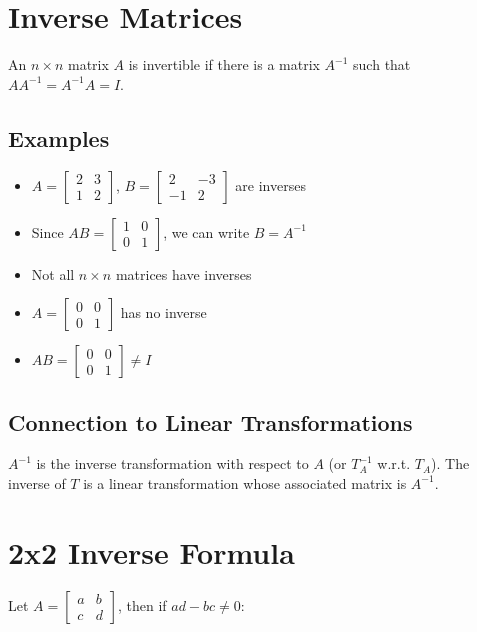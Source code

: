 \documentclass[12pt,a4paper]{article}
\begin{document}
\section{Inverse Matrices}

An $n \times n$ matrix $A$ is invertible if there is a matrix $A^{-1}$ such that $AA^{-1} = A^{-1}A = I$.

\subsection{Examples}
\begin{itemize}
    \item $A = \begin{bmatrix} 2 & 3 \\ 1 & 2 \end{bmatrix}$, $B = \begin{bmatrix} 2 & -3 \\ -1 & 2 \end{bmatrix}$ are inverses
    \item Since $AB = \begin{bmatrix} 1 & 0 \\ 0 & 1 \end{bmatrix}$, we can write $B = A^{-1}$
    \item Not all $n \times n$ matrices have inverses
    \item $A = \begin{bmatrix} 0 & 0 \\ 0 & 1 \end{bmatrix}$ has no inverse
    \item $AB = \begin{bmatrix} 0 & 0 \\ 0 & 1 \end{bmatrix} \neq I$
\end{itemize}

\subsection{Connection to Linear Transformations}
$A^{-1}$ is the inverse transformation with respect to $A$ (or $T_A^{-1}$ w.r.t. $T_A$). The inverse of $T$ is a linear transformation whose associated matrix is $A^{-1}$.

\section{2x2 Inverse Formula}

Let $A = \begin{bmatrix} a & b \\ c & d \end{bmatrix}$, then if $ad-bc \neq 0$:
\end{document}
